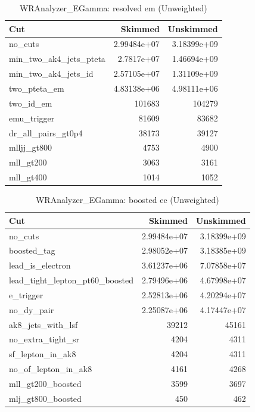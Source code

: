 \documentclass{article}
\begin{document}
\begin{table}[htbp]
\centering
\caption{WRAnalyzer\_EGamma: resolved em (Unweighted)}
\begin{tabular}{lrr}
\hline
Cut & Skimmed & Unskimmed \\
\hline
no\_cuts & 2.99484e+07 & 3.18399e+09 \\
min\_two\_ak4\_jets\_pteta & 2.7817e+07 & 1.46694e+09 \\
min\_two\_ak4\_jets\_id & 2.57105e+07 & 1.31109e+09 \\
two\_pteta\_em & 4.83138e+06 & 4.98111e+06 \\
two\_id\_em & 101683 & 104279 \\
emu\_trigger & 81609 & 83682 \\
dr\_all\_pairs\_gt0p4 & 38173 & 39127 \\
mlljj\_gt800 & 4753 & 4900 \\
mll\_gt200 & 3063 & 3161 \\
mll\_gt400 & 1014 & 1052 \\
\hline
\end{tabular}
\end{table}

\begin{table}[htbp]
\centering
\caption{WRAnalyzer\_EGamma: boosted ee (Unweighted)}
\begin{tabular}{lrr}
\hline
Cut & Skimmed & Unskimmed \\
\hline
no\_cuts & 2.99484e+07 & 3.18399e+09 \\
boosted\_tag & 2.98052e+07 & 3.18385e+09 \\
lead\_is\_electron & 3.61237e+06 & 7.07858e+07 \\
lead\_tight\_lepton\_pt60\_boosted & 2.79496e+06 & 4.67998e+07 \\
e\_trigger & 2.52813e+06 & 4.20294e+07 \\
no\_dy\_pair & 2.25087e+06 & 4.17447e+07 \\
ak8\_jets\_with\_lsf & 39212 & 45161 \\
no\_extra\_tight\_sr & 4204 & 4311 \\
sf\_lepton\_in\_ak8 & 4204 & 4311 \\
no\_of\_lepton\_in\_ak8 & 4161 & 4268 \\
mll\_gt200\_boosted & 3599 & 3697 \\
mlj\_gt800\_boosted & 450 & 462 \\
\hline
\end{tabular}
\end{table}
\end{document}
